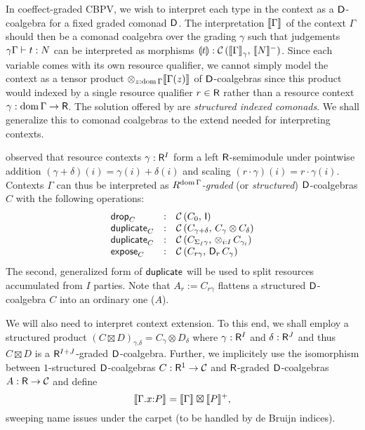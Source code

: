\documentclass[acmsmall,review,anonymous]{acmart}\settopmatter{printfolios=true,printccs=false,printacmref=false}
\begin{document}
In coeffect-graded CBPV, we wish to interpret each type in the context
as a $\D$-coalgebra for a fixed graded comonad $\D$.  The
interpretation $\den \Gamma$ of the context $\Gamma$ should then be a
comonad coalgebra over the grading $\gamma$ such that judgements
$\qCompTy \gamma \Gamma t N$ can be interpreted as morphisms
$\dent t : \Hom {\Den\Gamma \gamma} {\denn N}$.  Since each variable
comes with its own resource qualifier, we cannot simply model the
context as a tensor product $\tupt {z:\dom\Gamma} \den{\Gamma(z)}$ of
$\D$-coalgebras since this product would indexed by a single resource
qualifier $r \in \R$ rather than a resource context
$\gamma : \dom\Gamma \to \R$.  The solution offered by
\citet{orchard:icfp14} are \emph{structured indexed comonads}.  We
shall generalize this to comonad coalgebras to the extend needed for
interpreting contexts.

\citet{mcBride:wadler60} observed that resource contexts
$\gamma : \R^I$ form a left $\R$-semimodule under pointwise addition
$(\gamma + \delta)(i) = \gamma(i) + \delta(i)$ and scaling
$(r \cdot \gamma)(i) = r \cdot \gamma(i)$.  Contexts $\Gamma$ can thus
be interpreted as \emph{$R^{\dom \Gamma}$-graded}
(or \emph{structured}) $\D$-coalgebras $C$ with
the following operations:
\[
\begin{array}{lcl}
  \tdrop[C]     & : & \Hom {C_0} {\I} \\
  \duplicate[C] & : & \Hom {C_{\gamma+\delta}} {C_\gamma \otimes C_\delta} \\
  \duplicate[C] & : & \Hom {C_{\sumt I \gamma}} {\tupt {i:I} C_{\gamma_i}} \\
  \expose[C]    & : & \Hom {C_{r\gamma}} {\D[r]\,C_\gamma} \\
\end{array}
\]
The second, generalized form of $\tduplicate$ will be used to split
resources accumulated from $I$ parties.  Note that
$A_r := C_{r\gamma}$ flattens a structured $\D$-coalgebra $C$ into an
ordinary one ($A$).

We will also need to interpret context extension.  To this end, we
shall employ a structured product
$(C \boxtimes D)_{\gamma.\delta} = C_\gamma \otimes D_\delta$ where
$\gamma : \R^I$ and $\delta : \R^J$ and thus $C \boxtimes D$ is a
$\R^{I+J}$-graded $\D$-coalgebra.  Further, we implicitely use the
isomorphism between $1$-structured $\D$-coalgebras $C : \R^1 \to \CC$
and $\R$-graded $\D$-coalgebras $A : \R \to \CC$ and define
\[
\den{\ext \Gamma x P}
  = \den \Gamma \boxtimes \denp P
  ,
\]
sweeping name issues under the carpet (to be handled by de Bruijn indices).
\end{document}
